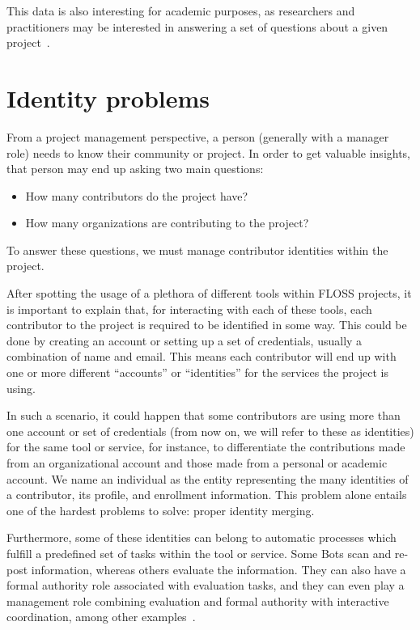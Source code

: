 \documentclass[a4paper, 12pt]{book}
\begin{document}
This data is also interesting for academic purposes, as researchers and practitioners may be interested in answering a set of questions about a given project~\cite{hemmati-et-al:msr-cookbook13}.

\section{Identity problems}
\label{sec:intro-identities}

From a project management perspective, a person (generally with a manager role) needs to know their community or project. In order to get valuable insights, that person may end up asking two main questions:

\begin{itemize}
    \item How many contributors do the project have?
    \item How many organizations are contributing to the project?
\end{itemize}

To answer these questions, we must manage contributor identities within the project.

After spotting the usage of a plethora of different tools within FLOSS projects, it is important to explain that, for interacting with each of these tools, each contributor to the project is required to be identified in some way. This could be done by creating an account or setting up a set of credentials, usually a combination of name and email. This means each contributor will end up with one or more different ``accounts'' or ``identities'' for the services the project is using.

In such a scenario, it could happen that some contributors are using more than one account or set of credentials (from now on, we will refer to these as identities) for the same tool or service, for instance, to differentiate the contributions made from an organizational account and those made from a personal or academic account. We name an individual as the entity representing the many identities of a contributor, its profile, and enrollment information. This problem alone entails one of the hardest problems to solve: proper identity merging.

Furthermore, some of these identities can belong to automatic processes which fulfill a predefined set of tasks within the tool or service. Some Bots scan and re-post information, whereas others evaluate the information. They can also have a formal authority role associated with evaluation tasks, and they can even play a management role combining evaluation and formal authority with interactive coordination, among other examples~\cite{hukal-et-al:bots-coordinating-oss}.
\end{document}
